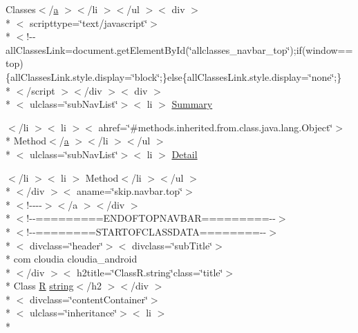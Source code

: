 \begin{DoxyCompactItemize}
\item 
Classes$<$/\hyperlink{style_8css_a5e8981582017bb8b84c21f148345d1f7}{a} $>$$<$/li $>$$<$/ul $>$$<$ div $>$\\*
$<$ scripttype=\char`\"{}text/javascript\char`\"{}$>$\\*
$<$!-\/-\/all\-Classes\-Link=document.\-get\-Element\-By\-Id(\char`\"{}allclasses\-\_\-navbar\-\_\-top\char`\"{});if(window==top)\{all\-Classes\-Link.\-style.\-display=\char`\"{}block\char`\"{};\}else\{all\-Classes\-Link.\-style.\-display=\char`\"{}none\char`\"{};\}\\*
$<$/script $>$$<$/div $>$$<$ div $>$\\*
$<$ ulclass=\char`\"{}sub\-Nav\-List\char`\"{}$>$$<$ li $>$ \hyperlink{_r_8string_8html_a6f9ab45abc9b0679dc1b132fbacfc681}{Summary}
\item 
$<$/li $>$$<$ li $>$$<$ ahref=\char`\"{}\#methods.\-inherited.\-from.\-class.\-java.\-lang.\-Object\char`\"{}$>$\\*
 Method$<$/\hyperlink{style_8css_a5e8981582017bb8b84c21f148345d1f7}{a} $>$$<$/li $>$$<$/ul $>$\\*
$<$ ulclass=\char`\"{}sub\-Nav\-List\char`\"{}$>$$<$ li $>$ \hyperlink{_r_8string_8html_aed0df2ae11502bf9389ac3cf53b1c0f6}{Detail}
\item 
$<$/li $>$$<$ li $>$ Method$<$/li $>$$<$/ul $>$\\*
$<$/div $>$$<$ aname=\char`\"{}skip.\-navbar.\-top\char`\"{}$>$\\*
$<$!-\/-\/-\/-\/$>$$<$/a $>$$<$/div $>$\\*
$<$!-\/-\/=========E\-N\-D\-O\-F\-T\-O\-P\-N\-A\-V\-B\-A\-R=========-\/-\/$>$\\*
$<$!-\/-\/========S\-T\-A\-R\-T\-O\-F\-C\-L\-A\-S\-S\-D\-A\-T\-A========-\/-\/$>$\\*
$<$ divclass=\char`\"{}header\char`\"{}$>$$<$ divclass=\char`\"{}sub\-Title\char`\"{}$>$\\*
 com cloudia cloudia\-\_\-android\\*
$<$/div $>$$<$ h2title=\char`\"{}Class\-R.\-string\char`\"{}class=\char`\"{}title\char`\"{}$>$\\*
 Class \hyperlink{index-16_8html_a31e8fe59be5c20ce90a0090e28a0c1fe}{R} \hyperlink{index-17_8html_abd5fc08c07311a696bb9d8fb49da0fed}{string}$<$/h2 $>$$<$/div $>$\\*
$<$ divclass=\char`\"{}content\-Container\char`\"{}$>$\\*
$<$ ulclass=\char`\"{}inheritance\char`\"{}$>$$<$ li $>$\\*

\end{DoxyCompactItemize}
